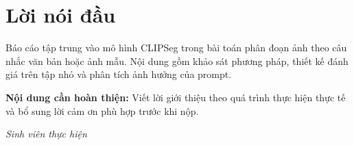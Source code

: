 \chapter*{Lời nói đầu}

Báo cáo tập trung vào mô hình CLIPSeg trong bài toán phân đoạn ảnh theo câu nhắc văn bản hoặc ảnh mẫu. Nội dung gồm khảo sát phương pháp, thiết kế đánh giá trên tập nhỏ và phân tích ảnh hưởng của prompt.

\medskip
\noindent\textbf{Nội dung cần hoàn thiện:} Viết lời giới thiệu theo quá trình thực hiện thực tế và bổ sung lời cảm ơn phù hợp trước khi nộp.

\vspace{1cm}
\begin{flushright}
\textit{Sinh viên thực hiện}\\
\textit{\studentone}
\end{flushright}
